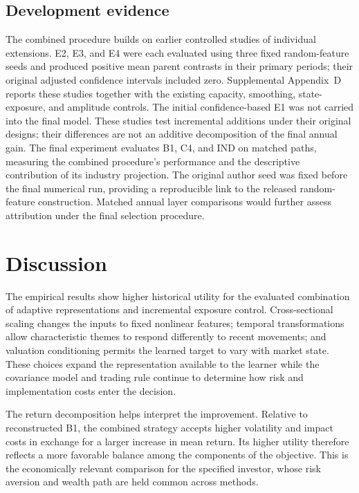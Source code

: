 \documentclass[12pt,letterpaper,fleqn]{article}
\begin{document}
\subsection{Development evidence}
The combined procedure builds on earlier controlled studies of individual extensions. E2, E3, and E4 were each evaluated using three fixed random-feature seeds and produced positive mean parent contrasts in their primary periods; their original adjusted confidence intervals included zero. Supplemental Appendix~D reports these studies together with the existing capacity, smoothing, state-exposure, and amplitude controls. The initial confidence-based E1 was not carried into the final model. These studies test incremental additions under their original designs; their differences are not an additive decomposition of the final annual gain. The final experiment evaluates B1, C4, and IND on matched paths, measuring the combined procedure's performance and the descriptive contribution of its industry projection. The original author seed was fixed before the final numerical run, providing a reproducible link to the released random-feature construction. Matched annual layer comparisons would further assess attribution under the final selection procedure.

\FloatBarrier
\section{Discussion}\label{sec:discussion}
The empirical results show higher historical utility for the evaluated combination of adaptive representations and incremental exposure control. Cross-sectional scaling changes the inputs to fixed nonlinear features; temporal transformations allow characteristic themes to respond differently to recent movements; and valuation conditioning permits the learned target to vary with market state. These choices expand the representation available to the learner while the covariance model and trading rule continue to determine how risk and implementation costs enter the decision.

The return decomposition helps interpret the improvement. Relative to reconstructed B1, the combined strategy accepts higher volatility and impact costs in exchange for a larger increase in mean return. Its higher utility therefore reflects a more favorable balance among the components of the objective. This is the economically relevant comparison for the specified investor, whose risk aversion and wealth path are held common across methods.
\end{document}

